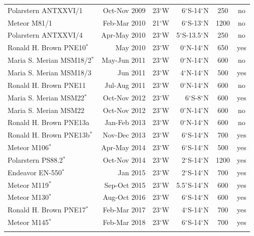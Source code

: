 \documentclass[os, manuscript]{copernicus}
\begin{document}
\begin{table}[t]
\begin{tabular}{lrcrcc}
		Polarstern ANTXXVI/1 & Oct-Nov 2009 & 23$^{\circ}$W & 6$^{\circ}$S-14$^{\circ}$N & 250 & no \\
		Meteor M81/1 & Feb-Mar 2010 & 21$^{\circ}$W & 6$^{\circ}$S-13$^{\circ}$N & 1200 & no  \\
		Polarstern ANTXXVI/4 & Apr-May 2010 & 23$^{\circ}$W & 5$^{\circ}$S-13.5$^{\circ}$N & 250 & no\\
		Ronald H. Brown PNE10$ ^{*} $ & May 2010 & 23$^{\circ}$W & 0$^{\circ}$N-14$^{\circ}$N & 650 & yes  \\
		Maria S. Merian MSM18/2$ ^{*} $ & May-Jun 2011 & 23$^{\circ}$W & 0$^{\circ}$N-14$^{\circ}$N & 600 & no  \\
		Maria S. Merian MSM18/3 & Jun 2011 & 23$^{\circ}$W & 4$^{\circ}$N-14$^{\circ}$N & 500 & yes \\
		Ronald H. Brown PNE11 & Jul-Aug 2011 & 23$^{\circ}$W & 0$^{\circ}$N-14$^{\circ}$N & 600 & no  \\
		Maria S. Merian MSM22$ ^{*} $ & Oct-Nov 2012 & 23$^{\circ}$W & 6$^{\circ}$S-8$^{\circ}$N & 600 & yes  \\
		Maria S. Merian MSM22 & Oct-Nov 2012 & 23$^{\circ}$W & 0$^{\circ}$N-14$^{\circ}$N & 600 & no \\
		Ronald H. Brown PNE13a & Jan-Feb 2013 & 23$^{\circ}$W & 0$^{\circ}$N-14$^{\circ}$N & 600 & no  \\
		Ronald H. Brown PNE13b$ ^{*} $ & Nov-Dec 2013 & 23$^{\circ}$W & 6$^{\circ}$S-14$^{\circ}$N & 700 & yes  \\
		Meteor M106$ ^{*} $ & Apr-May 2014 & 23$^{\circ}$W & 6$^{\circ}$S-14$^{\circ}$N & 500 & yes  \\
		Polarstern PS88.2$ ^{*} $ & Oct-Nov 2014 & 23$^{\circ}$W & 2$^{\circ}$S-14$^{\circ}$N & 1200 & yes  \\ 
		Endeavor EN-550$ ^{*} $ & Jan 2015 & 23$^{\circ}$W & 2$^{\circ}$S-14$^{\circ}$N & 700 & yes \\
		Meteor M119$ ^{*} $ & Sep-Oct 2015 & 23$^{\circ}$W & 5.5$^{\circ}$S-14$^{\circ}$N & 600 & yes  \\
		Meteor M130$ ^{*} $ & Aug-Oct 2016 & 23$^{\circ}$W & 6$^{\circ}$S-14$^{\circ}$N & 600 & yes  \\
		Ronald H. Brown PNE17$ ^{*} $ & Feb-Mar 2017 & 23$^{\circ}$W & 4$^{\circ}$S-14$^{\circ}$N & 700 & yes \\
		Meteor M145$ ^{*} $ & Feb-Mar 2018 & 23$^{\circ}$W & 6$^{\circ}$S-14$^{\circ}$N & 700 & yes \\
		\bottomhline
	\end{tabular}
	\label{tab_cruises}
\end{table}
\end{document}
